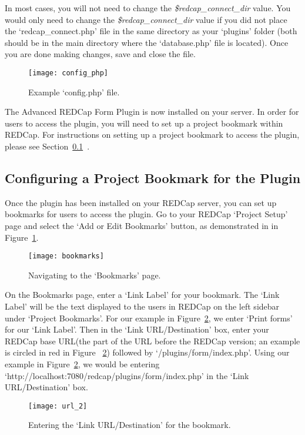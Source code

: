 \documentclass[12pt]{article}
\begin{document}
	In most cases, you will not need to change the \textit{\$redcap\_connect\_dir} value. You would only need to change the \textit{\$redcap\_connect\_dir} value if you did not place the  `redcap\_connect.php' file in the same directory as your `plugins' folder (both should be in the main directory where the `database.php' file is located). Once you are done making changes, save and close the file.         
         \begin{figure}[H]
	     \centering
             \texttt{[image: config\_php]}
             \caption{Example `config.php' file.} 
	\end{figure}
    The Advanced REDCap Form Plugin is now installed on your server. In order for users to access the plugin, you will need to set up a project bookmark within REDCap. For instructions on setting up a project bookmark to access the plugin, please see Section~\ref{sec:bookmark}~.
     \newpage

    \subsection{Configuring a Project Bookmark for the Plugin} \label{sec:bookmark}
	Once the plugin has been installed on your REDCap server, you can set up bookmarks for users to access the plugin. 
Go to your REDCap `Project Setup' page and select the `Add or Edit Bookmarks' button, as demonstrated in in Figure~\ref{fig:nav_bookmark}.
        \begin{figure}[H]
            \centering
               \texttt{[image: bookmarks]}
	       \caption{Navigating to the `Bookmarks' page.}
		\label{fig:nav_bookmark}
        \end{figure}
\newpage
        On the Bookmarks page, enter a `Link Label' for your bookmark. The `Link Label' will be the text displayed to the users in REDCap on the left sidebar under `Project Bookmarks'. For our example in Figure~\ref{fig:link_label}, we enter `Print forms' for our `Link Label'. Then in the `Link URL/Destination' box, enter your REDCap base URL(the part of the URL before the REDCap version; an example is circled in red in Figure ~\ref{fig:link_label}) followed by `/plugins/form/index.php'. Using our example in Figure~\ref{fig:link_label}, we would be entering \newline `http://localhost:7080/redcap/plugins/form/index.php' in the `Link URL/Destination' box.
	\begin{figure}[H]
	     \centering
             \texttt{[image: url\_2]}
	     \caption{Entering the `Link URL/Destination' for the bookmark.} 
	     \label{fig:link_label}
	\end{figure}
\newpage
\end{document}

